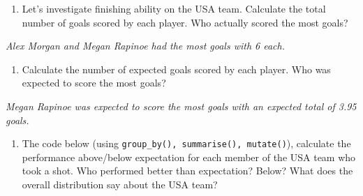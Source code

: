\documentclass[]{article}
\newenvironment{Shaded}{\begin{snugshade}}{\end{snugshade}}
\newcommand{\DataTypeTok}[1]{\textcolor[rgb]{0.13,0.29,0.53}{#1}}
\newcommand{\KeywordTok}[1]{\textcolor[rgb]{0.13,0.29,0.53}{\textbf{#1}}}
\newcommand{\NormalTok}[1]{#1}
\newcommand{\OperatorTok}[1]{\textcolor[rgb]{0.81,0.36,0.00}{\textbf{#1}}}
\newcommand{\StringTok}[1]{\textcolor[rgb]{0.31,0.60,0.02}{#1}}
\providecommand{\tightlist}{%
  \setlength{\itemsep}{0pt}\setlength{\parskip}{0pt}}
\begin{document}
\begin{enumerate}
\def\labelenumi{\arabic{enumi}.}
\setcounter{enumi}{3}
\tightlist
\item
  Let's investigate finishing ability on the USA team. Calculate the
  total number of goals scored by each player. Who actually scored the
  most goals?
\end{enumerate}

\begin{Shaded}
\end{Shaded}

\emph{Alex Morgan and Megan Rapinoe had the most goals with 6 each.}

\begin{enumerate}
\def\labelenumi{\arabic{enumi}.}
\setcounter{enumi}{4}
\tightlist
\item
  Calculate the number of expected goals scored by each player. Who was
  expected to score the most goals?
\end{enumerate}

\begin{Shaded}
\end{Shaded}

\emph{Megan Rapinoe was expected to score the most goals with an
expected total of 3.95 goals.}

\begin{enumerate}
\def\labelenumi{\arabic{enumi}.}
\setcounter{enumi}{5}
\tightlist
\item
  The code below (using \texttt{group\_by(),\ summarise(),\ mutate()}),
  calculate the performance above/below expectation for each member of
  the USA team who took a shot. Who performed better than expectation?
  Below? What does the overall distribution say about the USA team?
\end{enumerate}
\end{document}
